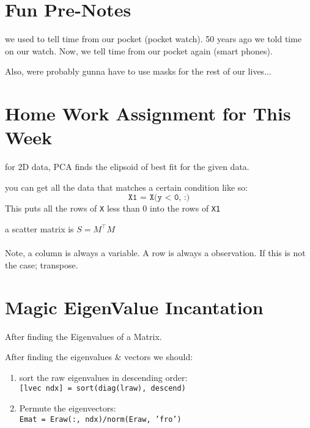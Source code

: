 \documentclass[12pt]{book}
\title{\coursetitle\linebreak\lecturename}
\author{\\Cain Susko\\ 
           \\ \\ \\
      Queen's University 
    \\School of Computing\\}
\begin{document}
\begin{titlepage}
        \maketitle
\end{titlepage}


\section*{Fun Pre-Notes}
we used to tell time from our pocket (pocket watch). 50 years ago we told time on our watch.
Now, we tell time from our pocket again (smart phones).

Also, were probably gunna have to use masks for the rest of our lives...

\section*{Home Work Assignment for This Week}
for 2D data, PCA finds the elipsoid of best fit for the given data.

you can get all the data that matches a certain condition like so:
\[\texttt{X1 = X(y < 0, :)}\]
This puts all the rows of \texttt{X} less than 0 into the rows of \texttt{X1}

a scatter matrix is $S = M^\top M$
\\
\\
Note, a column is always a variable. A row is always a observation. If this is not the case; transpose.

\section*{Magic EigenValue Incantation}
After finding the Eigenvalues of a Matrix.

After finding the eigenvalues \& vectors we should:
\begin{enumerate}
        \item sort the raw eigenvalues in descending order:\\
                \texttt{[lvec ndx] = sort(diag(lraw), descend)}
        \item Permute the eigenvectors:\\
                \texttt{Emat = Eraw(:, ndx)/norm(Eraw, 'fro')}
\end{enumerate}
\end{document}
